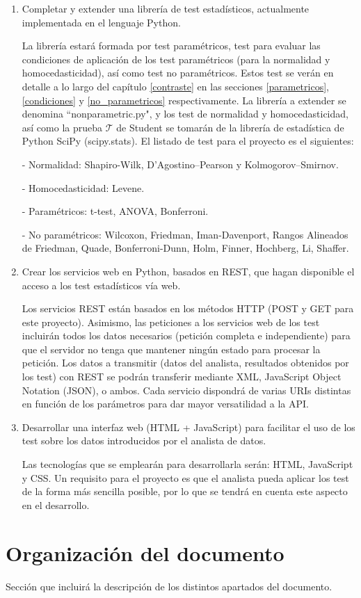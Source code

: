 \begin{enumerate}
\item Completar y extender una librería de test estadísticos, actualmente implementada en el lenguaje Python.

La librería estará formada por test paramétricos, test para evaluar las condiciones de aplicación de los test
paramétricos (para la normalidad y homocedasticidad), así como test no paramétricos. Estos test se verán en
detalle a lo largo del capítulo \ref{contraste} en las secciones \ref{parametricos}, \ref{condiciones} y
\ref{no_parametricos} respectivamente. La librería a extender se denomina ``nonparametric.py", y los test de
normalidad y homocedasticidad, así como la prueba  $\mathcal{T}$ de Student se tomarán de la librería de estadística
de Python SciPy (scipy.stats). El listado de test para el proyecto es el siguientes:

- Normalidad: Shapiro-Wilk, D’Agostino–Pearson y Kolmogorov–Smirnov.

- Homocedasticidad: Levene.

- Paramétricos: t-test, ANOVA, Bonferroni.

- No paramétricos: Wilcoxon, Friedman, Iman-Davenport, Rangos Alineados de Friedman, Quade, Bonferroni-Dunn,
Holm, Finner, Hochberg, Li, Shaffer.

\item Crear los servicios web en Python, basados en REST, que hagan disponible el acceso a los
test estadísticos vía web.

Los servicios REST están basados en los métodos HTTP (POST y GET para este proyecto). Asimismo, las peticiones
a los servicios web de los test incluirán todos los datos necesarios (petición completa e independiente) para
que el servidor no tenga que mantener ningún estado para procesar la petición. Los datos a transmitir (datos del
analista, resultados obtenidos por los test) con REST se podrán transferir mediante XML, JavaScript Object
Notation (JSON), o ambos. Cada servicio dispondrá de varias URIs distintas en función de los parámetros para dar
mayor versatilidad a la API.

\item Desarrollar una interfaz web (HTML + JavaScript) para facilitar el uso de los test sobre los
datos introducidos por el analista de datos.

Las tecnologías que se emplearán para desarrollarla serán: HTML, JavaScript y CSS. Un requisito para el proyecto
es que el analista pueda aplicar los test de la forma más sencilla posible, por lo que se tendrá en cuenta este
aspecto en el desarrollo.
\end{enumerate}


\section{Organización del documento}
Sección que incluirá la descripción de los distintos apartados del documento.


